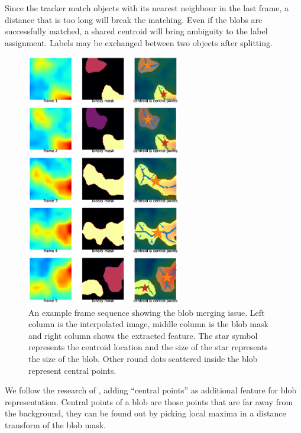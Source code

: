 Since the tracker match objects with its nearest neighbour in the last frame, a distance that is too long will break the matching. Even if the blobs are successfully matched, a shared centroid will bring ambiguity to the label assignment. Labels may be exchanged between two objects after splitting.
\begin{figure}
  \centering
  \includegraphics[width=0.6\textwidth]{figures/blobmerge.eps}
  \caption{An example frame sequence showing the blob merging issue. Left column is the interpolated image, middle column is the blob mask and right column shows the extracted feature. The star symbol represents the centroid location and the size of the star represents the size of the blob. Other round dots scattered inside the blob represent central points.}\label{fig:blobmerge}
\end{figure}

We follow the research of \cite{sharma2012blob}, adding ``central points'' as additional feature for blob representation. Central points of a blob are those points that are far away from the background, they can be found out by picking local maxima in a distance transform of the blob mask.
